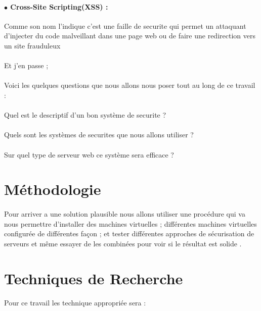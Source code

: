    \paragraph{$\bullet$ Cross-Site Scripting(XSS) :} Comme son nom l'indique c'est une faille de securite qui permet un attaquant d'injecter du code malveillant dans une page web ou de faire une redirection vers un site frauduleux 
   \paragraph{ }
   Et j'en passe ;
   \pagebreak
   \paragraph{ }
   Voici les  quelques questions que nous allons nous poser tout au long de ce travail :
   \paragraph{ }
   \textendash \space Quel est le descriptif d'un bon système de securite ?
   \paragraph{ }
   \textendash \space Quels sont les systèmes de securites  que nous allons utiliser ?
   \paragraph{ }
   \textendash \space Sur quel type de serveur web ce système sera efficace ?
   \section{Méthodologie}
   \paragraph{ }
   Pour arriver a une solution plausible  nous allons utiliser une procédure  qui va nous permettre d'installer des machines virtuelles ; différentes machines virtuelles configurée de différentes façon  ;  et tester différentes approches de sécurisation de serveurs et même essayer de les combinées pour voir si le résultat est solide .
  \section{ Techniques de Recherche }
  \paragraph{ }
  Pour ce travail les technique appropriée sera :
